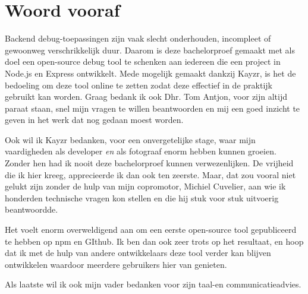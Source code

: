 
\chapter*{Woord vooraf}
\label{ch:voorwoord}


Backend debug-toepassingen zijn vaak slecht onderhouden, incompleet of gewoonweg verschrikkelijk duur. Daarom is deze bachelorproef gemaakt met als doel een open-source debug tool te schenken aan iedereen die een project in Node.js en Express ontwikkelt. Mede mogelijk gemaakt dankzij Kayzr, is het de bedoeling om deze tool online te zetten zodat deze effectief in de praktijk gebruikt kan worden. Graag bedank ik ook Dhr. Tom Antjon, voor zijn altijd paraat staan, snel mijn vragen te willen beantwoorden en mij een goed inzicht te geven in het werk dat nog gedaan moest worden.

Ook wil ik Kayzr bedanken, voor een onvergetelijke stage, waar mijn vaardigheden als developer \textit{en} als fotograaf enorm hebben kunnen groeien. Zonder hen had ik nooit deze bachelorproef kunnen verwezenlijken. De vrijheid die ik hier kreeg, apprecieerde ik dan ook ten zeerste. Maar, dat zou vooral niet gelukt zijn zonder de hulp van mijn copromotor, Michiel Cuvelier, aan wie ik honderden technische vragen kon stellen en die hij stuk voor stuk uitvoerig beantwoordde. 

Het voelt enorm overweldigend aan  om een eerste open-source tool gepubliceerd te hebben op npm en GIthub. Ik ben dan ook zeer trots op het resultaat, en hoop dat ik met de hulp van andere ontwikkelaars deze tool verder kan blijven ontwikkelen waardoor meerdere gebruikers hier van genieten. 

Als laatste wil ik ook mijn vader bedanken voor zijn taal-en communicatieadvies.

